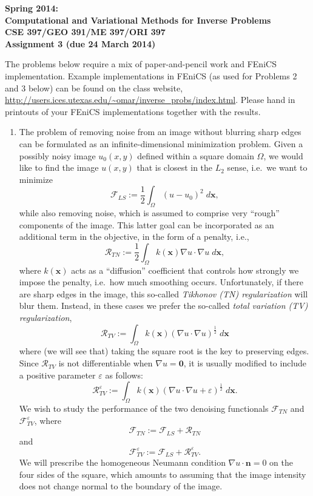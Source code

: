 \documentclass[12pt]{article}
\newcommand{\bdm}{\begin{displaymath}}
\newcommand{\edm}{\end{displaymath}}
\begin{document}
\begin{center}
\large \textsf{\textbf{%
Spring 2014: \\ 
Computational and Variational Methods for Inverse Problems\\
CSE 397/GEO 391/ME 397/ORI 397\\
Assignment 3 (due 24 March 2014)}}
\end{center}

\noindent
The problems below require a mix of paper-and-pencil work and FEniCS implementation.
Example implementations in FEniCS (as used for Problems 2 and 3 below) can be found on the class
website,
\url{http://users.ices.utexas.edu/~omar/inverse_probs/index.html}. Please
hand in printouts of your FEniCS implementations together with the
results.

\begin{enumerate}

\item The problem of removing noise from an image without blurring
sharp edges can be formulated as an infinite-dimensional minimization
problem. Given a possibly noisy image $u_0(x,y)$ defined within a
square domain $\Omega$, we would like to
find the image $u(x,y)$ that is closest in the $L_2$ sense, i.e.\ we
want to minimize 
%
\bdm
\mathcal{F}_{LS} := \frac{1}{2}\int_\Omega (u - u_0)^2 \; d\boldsymbol{x},
\edm
%
while also removing noise, which is assumed to comprise very ``rough''
components of the image. This latter goal can be incorporated as an
additional term in the objective, in the form of a penalty, i.e., 
%
\bdm \mathcal{R}_{TN} := \! \frac{1}{2}\int_\Omega k(\boldsymbol{x}) \nabla u
\cdot \! \nabla u \; d\boldsymbol{x}, 
\edm 
%
where $k(\boldsymbol{x})$ acts as a ``diffusion'' coefficient that controls
how strongly we impose the penalty, i.e.\ how much smoothing
occurs. Unfortunately, if there are sharp edges in the image, this
so-called {\em Tikhonov (TN) regularization} will blur them. Instead,
in these cases we prefer the so-called {\em total variation (TV)
regularization},
%
\bdm
\mathcal{R}_{TV} := \! \int_\Omega k(\boldsymbol{x}) (\nabla u \cdot \! \nabla
u)^{\frac{1}{2}} \; d\boldsymbol{x}
\edm
%
where (we will see that) taking the square root is the key to
preserving edges. Since 
$\mathcal{R}_{TV}$ is not differentiable when $\nabla u =
\boldsymbol{0}$, it is usually modified to include a positive parameter
$\varepsilon$ as follows:
\bdm
\mathcal{R}^{\varepsilon}_{TV} := \!  \int_\Omega k(\boldsymbol{x}) (\nabla u \cdot
\! \nabla u + \varepsilon)^{\frac{1}{2}} \; d\boldsymbol{x}.
\edm
We wish to study the performance of the two denoising functionals
$\mathcal{F}_{TN}$ and $\mathcal{F}^{\varepsilon}_{TV}$, where
\bdm
\mathcal{F}_{TN}  := \mathcal{F}_{LS} + \mathcal{R}_{TN}  
\edm
and
\bdm
\mathcal{F}^{\varepsilon}_{TV}  := \mathcal{F}_{LS} +
      \mathcal{R}^{\varepsilon}_{TV}.
\edm
%
We will prescribe the homogeneous Neumann condition 
$\nabla u \cdot \boldsymbol{n}=0$ on the four sides of the square,
which amounts to assuming that the image intensity does not change
normal to the boundary of the image. 


\end{enumerate}
\end{document}
